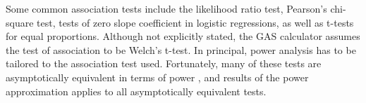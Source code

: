 Some common association tests include the likelihood ratio test, Pearson's chi-square test, tests of zero slope coefficient in logistic regressions, as well as t-tests for equal proportions.
Although not explicitly stated, the GAS calculator assumes the test of association to be Welch's t-test.
In principal, power analysis has to be tailored to the association test used.
Fortunately, many of these tests are asymptotically equivalent in terms of power \citep{ferguson2017course, gao2019upass}, and results of the power approximation applies to all asymptotically equivalent tests.




